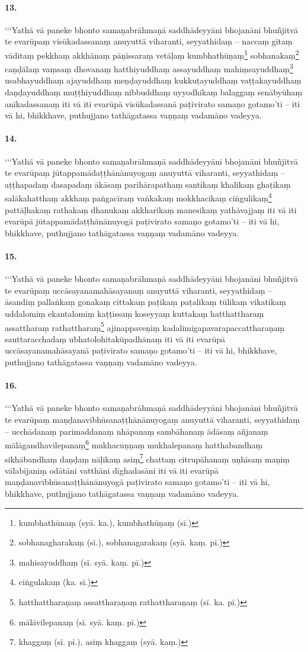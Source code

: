 \paragraph{13.}
 ‘‘‘Yathā vā paneke bhonto samaṇabrāhmaṇā saddhādeyyāni bhojanāni bhuñjitvā te evarūpaṃ visūkadassanaṃ anuyuttā viharanti, seyyathidaṃ – naccaṃ gītaṃ vāditaṃ pekkhaṃ akkhānaṃ pāṇissaraṃ vetāḷaṃ kumbhathūṇaṃ\footnote{kumbhathūnaṃ (syā. ka.), kumbhathūṇaṃ (sī.)} sobhanakaṃ\footnote{sobhanagharakaṃ (sī.), sobhanagarakaṃ (syā. kaṃ. pī.)} caṇḍālaṃ vaṃsaṃ dhovanaṃ hatthiyuddhaṃ assayuddhaṃ mahiṃsayuddhaṃ\footnote{mahisayuddhaṃ (sī. syā. kaṃ. pī.)} usabhayuddhaṃ ajayuddhaṃ meṇḍayuddhaṃ kukkuṭayuddhaṃ vaṭṭakayuddhaṃ daṇḍayuddhaṃ muṭṭhiyuddhaṃ nibbuddhaṃ uyyodhikaṃ balaggaṃ senābyūhaṃ anīkadassanaṃ iti vā iti evarūpā visūkadassanā paṭivirato samaṇo gotamo’ti – iti vā hi, bhikkhave, puthujjano tathāgatassa vaṇṇaṃ vadamāno vadeyya.

\paragraph{14.}
‘‘‘Yathā vā paneke bhonto samaṇabrāhmaṇā saddhādeyyāni bhojanāni bhuñjitvā te evarūpaṃ jūtappamādaṭṭhānānuyogaṃ anuyuttā viharanti, seyyathidaṃ – aṭṭhapadaṃ dasapadaṃ ākāsaṃ parihārapathaṃ santikaṃ khalikaṃ ghaṭikaṃ salākahatthaṃ akkhaṃ paṅgacīraṃ vaṅkakaṃ mokkhacikaṃ ciṅgulikaṃ\footnote{ciṅgulakaṃ (ka. sī.)} pattāḷhakaṃ rathakaṃ dhanukaṃ akkharikaṃ manesikaṃ yathāvajjaṃ iti vā iti evarūpā jūtappamādaṭṭhānānuyogā paṭivirato samaṇo gotamo’ti – iti vā hi, bhikkhave, puthujjano tathāgatassa vaṇṇaṃ vadamāno vadeyya.

\paragraph{15.}
‘‘‘Yathā vā paneke bhonto samaṇabrāhmaṇā saddhādeyyāni bhojanāni bhuñjitvā te evarūpaṃ uccāsayanamahāsayanaṃ anuyuttā viharanti, seyyathidaṃ – āsandiṃ pallaṅkaṃ gonakaṃ cittakaṃ paṭikaṃ paṭalikaṃ tūlikaṃ vikatikaṃ uddalomiṃ ekantalomiṃ kaṭṭissaṃ koseyyaṃ kuttakaṃ hatthattharaṃ assattharaṃ rathattharaṃ\footnote{hatthattharaṇaṃ assattharaṇaṃ rathattharaṇaṃ (sī. ka. pī.)} ajinappaveṇiṃ kadalimigapavarapaccattharaṇaṃ sauttaracchadaṃ ubhatolohitakūpadhānaṃ iti vā iti evarūpā uccāsayanamahāsayanā paṭivirato samaṇo gotamo’ti – iti vā hi, bhikkhave, puthujjano tathāgatassa vaṇṇaṃ vadamāno vadeyya.

\paragraph{16.}
 ‘‘‘Yathā vā paneke bhonto samaṇabrāhmaṇā saddhādeyyāni bhojanāni bhuñjitvā te evarūpaṃ maṇḍanavibhūsanaṭṭhānānuyogaṃ anuyuttā viharanti, seyyathidaṃ – ucchādanaṃ parimaddanaṃ nhāpanaṃ sambāhanaṃ ādāsaṃ añjanaṃ mālāgandhavilepanaṃ\footnote{mālāvilepanaṃ (sī. syā. kaṃ. pī.)} mukhacuṇṇaṃ mukhalepanaṃ hatthabandhaṃ sikhābandhaṃ daṇḍaṃ nāḷikaṃ asiṃ\footnote{khaggaṃ (sī. pī.), asiṃ khaggaṃ (syā. kaṃ.)} chattaṃ citrupāhanaṃ uṇhīsaṃ maṇiṃ vālabījaniṃ odātāni vatthāni dīghadasāni iti vā iti evarūpā maṇḍanavibhūsanaṭṭhānānuyogā paṭivirato samaṇo gotamo’ti – iti vā hi, bhikkhave, puthujjano tathāgatassa vaṇṇaṃ vadamāno vadeyya.

